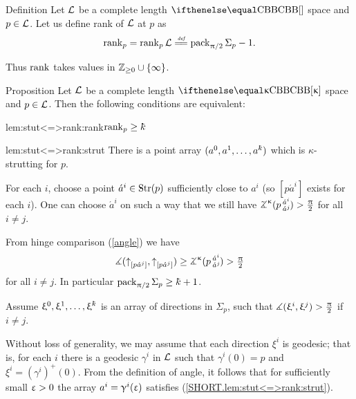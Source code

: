 \begin{thm}{Definition}\label{def:rank}
Let $\mathcal{L}$ be a complete length $\Alex{}$ space
and $p\in \spc{L}$.
Let us define rank of $\mathcal{L}$ at $p$ as 
\[\rank_p=\rank_p\spc{L}
\df\pack_{\pi/2}\Sigma_p-1.\]

\end{thm}




Thus $\mathop{\rm rank}\nolimits$ takes values in $\ZZ_{\ge0}\cup\{\infty\}$.


\begin{thm}{Proposition}\label{prop:stutt}
Let $\mathcal{L}$ be a complete length $\Alex{\kappa}$ space 
and $p\in \spc{L}$.
Then the following conditions are equivalent:

\begin{subthm}{lem:stut<=>rank:rank}$\rank_p\ge\kay$
\end{subthm}

\begin{subthm}{lem:stut<=>rank:strut}
There is a point array $(a^0,a^1,\dots,a^\kay)$ which is $\kappa$-strutting for $p$.
\end{subthm}
\end{thm}

For each $i$,
choose a point $\acute a^i\in\Str(p)$ sufficiently close to $a^i$ (so $[p\acute a^i]$ exists for each $i$).
One can choose $\acute a^i$ on such a way that we still have
$\angk\kappa{p}{\acute a^i}{\acute a^j}>\tfrac\pi2$ for all $i\not=j$.

From hinge comparison (\ref{angle}) we have 
\[\mangle(\dir{p}{\acute a^j},\dir{p}{\acute a^j})
\ge
\angk\kappa{p}{\acute a^i}{\acute a^j}
>
\tfrac\pi2\]
for all $i\not=j$.
In particular $\pack_{\pi/2}\Sigma_p\ge \kay+1$.

Assume $\xi^0,\xi^1,\dots,\xi^\kay$ is an array of directions in $\Sigma_p$, such that $\measuredangle(\upxi^i,\upxi^j)>\tfrac{\uppi}2$ if $i\not=j$.

Without loss of generality, 
we may assume that each direction $\xi^i$ is geodesic;
that is, for each $i$ there is a geodesic $\gamma^i$ in $\mathcal{L}$ such that $\gamma^i(0)=p$ and $\xi^i=(\gamma^i)^+(0)$.
From the definition of angle, it follows that for sufficiently small $\upvarepsilon>0$ the array $a^i=\upgamma^i(\upvarepsilon)$ satisfies (\ref{SHORT.lem:stut<=>rank:strut}).
\qeds

